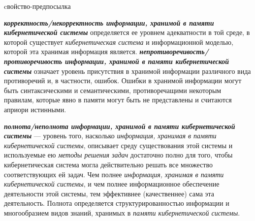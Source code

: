 \begin{SCn}
\begin{scnrelfromlist}{cвойство-предпосылка}
\end{scnrelfromlist}
\end{SCn}

\textbf{\textit{корректность/некорректность информации, хранимой в памяти кибернетической системы}} определяется ее уровнем адекватности в той среде, в которой существует \textit{кибернетическая система} и информационной моделью, которой эта хранимая информация является. 
\textbf{\textit{непротиворечивость/противоречивость информации, хранимой в памяти кибернетической системы}} означает уровень присутствия в хранимой информации различного вида противоречий и, в частности, ошибок. 
Ошибки в хранимой информации могут быть синтаксическими и семантическими, противоречащими некоторым правилам, которые явно в памяти могут быть не представлены и считаются априори истинными.

\textbf{\textit{полнота/неполнота информации, хранимой в памяти кибернетической системы}} --- уровень того, насколько \textit{информация, хранимая в памяти кибернетической системы}, описывает среду существования этой системы и используемые ею \textit{методы решения задач} достаточно полно для того, чтобы кибернетическая система могла действительно решать все множество соответствующих ей задач. 
Чем полнее \textit{информация, хранимая в памяти кибернетической системы}, и чем полнее информационное обеспечение деятельности этой системы, тем эффективнее (качественнее) сама эта деятельность. 
Полнота определяется структурированностью информации и многообразием видов знаний, хранимых в \textit{памяти кибернетической системы}.

